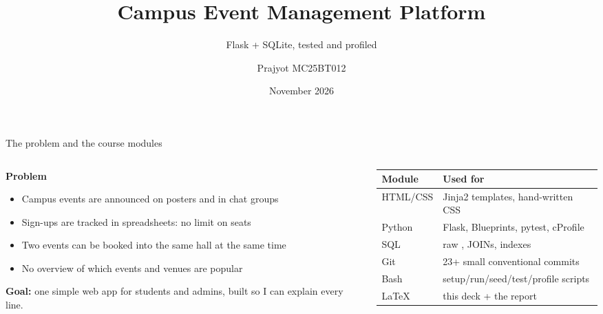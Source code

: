 \documentclass[aspectratio=169,11pt]{beamer}
\title[Campus Event Management Platform]{Campus Event Management Platform}
\subtitle{Flask + SQLite, tested and profiled}
\author{Prajyot MC25BT012}
\institute[CS 202C]{CS 202C}
\date{November 2026}
\newcommand{\code}[1]{\texttt{\detokenize{#1}}}
\begin{document}
\begin{frame}
  \titlepage
\end{frame}

\begin{frame}{The problem and the course modules}
  \begin{columns}[T]
    \begin{column}{0.47\textwidth}
      \textbf{Problem}
      \begin{itemize}
        \item Campus events are announced on posters and in chat groups
        \item Sign-ups are tracked in spreadsheets: no limit on seats
        \item Two events can be booked into the same hall at the same time
        \item No overview of which events and venues are popular
      \end{itemize}
      \vspace{4pt}
      \textbf{Goal:} one simple web app for students and admins, built so I can explain every line.
    \end{column}
    \begin{column}{0.5\textwidth}
      \small
      \begin{tabular}{@{}l l@{}}
        \toprule
        \textbf{Module} & \textbf{Used for} \\
        \midrule
        HTML/CSS & Jinja2 templates, hand-written CSS \\
        Python   & Flask, Blueprints, pytest, cProfile \\
        SQL      & raw \code{sqlite3}, JOINs, indexes \\
        Git      & 23+ small conventional commits \\
        Bash     & setup/run/seed/test/profile scripts \\
        LaTeX    & this deck + the report \\
        \bottomrule
      \end{tabular}
    \end{column}
  \end{columns}
\end{frame}
\end{document}
